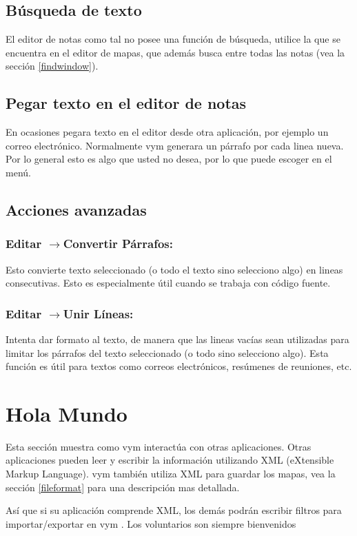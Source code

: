 \documentclass{article}
\newcommand{\vym}{{\sc vym }}
\newcommand{\ra}{$\longrightarrow$}
\begin{document}
\subsection{B\'usqueda de texto}
El editor de notas como tal no posee una funci\'on de b\'usqueda, utilice la que se encuentra en el editor de mapas, que adem\'as busca entre todas las notas (vea la secci\'on \ref{findwindow}).

\subsection{Pegar texto en el editor de notas}
En ocasiones pegara texto en el editor desde otra aplicaci\'on, por ejemplo un correo electr\'onico. Normalmente \vym generara un p\'arrafo por cada linea nueva. Por lo general esto es algo que usted no desea, por lo que puede escoger en el men\'u.

\subsection{Acciones avanzadas}
\subsubsection*{Editar \ra Convertir P\'arrafos:}
Esto convierte texto seleccionado (o todo el texto sino selecciono algo) en lineas consecutivas. Esto es especialmente \'util cuando se trabaja con c\'odigo fuente.


\subsubsection*{Editar \ra Unir L\'ineas:}
Intenta dar formato al texto, de manera que las lineas vac\'ias sean utilizadas para limitar los p\'arrafos del texto seleccionado (o todo sino selecciono algo). Esta funci\'on es \'util para textos como correos electr\'onicos, res\'umenes de reuniones, etc.

\section{Hola Mundo}
Esta secci\'on muestra como \vym interact\'ua con otras aplicaciones. Otras aplicaciones pueden leer y escribir la informaci\'on utilizando XML (eXtensible Markup Language). \vym tambi\'en utiliza XML para guardar los mapas, vea la secci\'on \ref{fileformat}  para una descripci\'on mas detallada.

As\'i que si su aplicaci\'on comprende XML, los dem\'as podr\'an escribir filtros para importar/exportar en \vym. Los voluntarios son siempre bienvenidos
\end{document}
